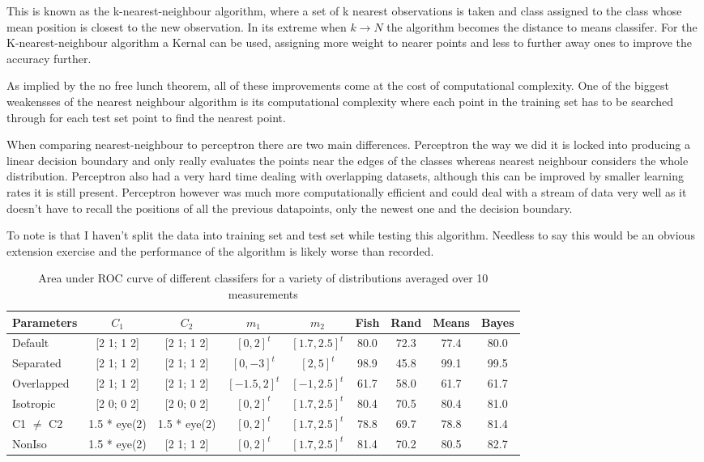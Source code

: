 \documentclass[a4paper,11pt, twocolumn]{article}
\begin{document}
This is known as the k-nearest-neighbour algorithm, where a set of k nearest observations is taken and class assigned to the class whose mean position is closest to the new observation. In its extreme when $k \rightarrow N$ the algorithm becomes the distance to means classifer. For the K-nearest-neighbour algorithm a Kernal can be used, assigning more weight to nearer points and less to further away ones to improve the accuracy further. 

As implied by the no free lunch theorem, all of these improvements come at the cost of computational complexity. One of the biggest weakensses of the nearest neighbour algorithm is its computational complexity where each point in the training set has to be searched through for each test set point to find the nearest point.

When comparing nearest-neighbour to perceptron there are two main differences. Perceptron the way we did it is locked into producing a linear decision boundary and only really evaluates the points near the edges of the classes whereas nearest neighbour considers the whole distribution. Perceptron also had a very hard time dealing with overlapping datasets, although this can be improved by smaller learning rates it is still present. Perceptron however was much more computationally efficient and could deal with a stream of data very well as it doesn't have to recall the positions of all the previous datapoints, only the newest one and the decision boundary. 

To note is that I haven't split the data into training set and test set while testing this algorithm. Needless to say this would be an obvious extension exercise and the performance of the algorithm is likely worse than recorded. 

\begin{table}[h]
	\begin{tabular}{l*{8}{c}}
		Parameters & $C_1$ & $C_2$ & $m_1$ & $m_2$ & Fish & Rand & Means & Bayes \\
		\hline
		Default & [2 1; 1 2] & [2 1; 1 2] & $[0,2]^t$ & $[1.7,2.5]^t$ & 80.0 & 72.3 & 77.4 & 80.0 \\
		Separated & [2 1; 1 2] & [2 1; 1 2] & $[0,-3]^t$ & $[2,5]^t$ & 98.9 & 45.8 & 99.1 & 99.5 \\
		Overlapped & [2 1; 1 2] & [2 1; 1 2] & $[-1.5,2]^t$ & $[-1,2.5]^t$ &61.7 &58.0 & 61.7 & 61.7 \\
		Isotropic & [2 0; 0 2] & [2 0; 0 2] & $[0,2]^t$ & $[1.7,2.5]^t$ & 80.4 & 70.5 & 80.4 & 81.0 \\
		C1 $\neq$ C2 & 1.5 * eye(2) & 1.5 * eye(2) & $[0,2]^t$ & $[1.7,2.5]^t$ & 78.8 & 69.7 & 78.8 & 81.4 \\
		NonIso & 1.5 * eye(2) & [2 1; 1 2] & $[0,2]^t$ & $[1.7,2.5]^t$ & 81.4 & 70.2 & 80.5 & 82.7 \\
	\end{tabular}
	\caption{Area under ROC curve of different classifers for a variety of distributions averaged over 10 measurements}
	\label{table:AUCresults}
\end{table}
\end{document}
